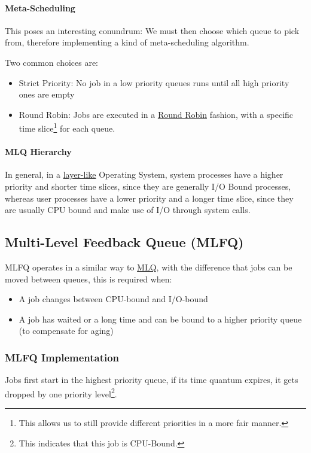 \documentclass[openright, twoside]{report}
\theoremstyle{definition}
\theoremstyle{example}
\begin{document}
	\paragraph{Meta-Scheduling} 
		This poses an interesting conundrum: We must then choose which queue to pick from,
		therefore implementing a kind of meta-scheduling algorithm.

		Two common choices are:
		\begin{itemize}
			\item Strict Priority: No job in a low priority queues runs until all high
			priority ones are empty
			\item Round Robin: Jobs are executed in a \hyperref[ssec:RR]{Round Robin} fashion,
			with a specific time slice\footnote{This allows us to still provide different
			priorities in a more fair manner.} for each queue.
		\end{itemize}

	\paragraph{MLQ Hierarchy}
	\label{par:MLQ_h}
		In general, in a \hyperref[par:OS_layer]{layer-like} Operating System,
		system processes have a higher priority and shorter time slices, since they are
		generally I/O Bound processes, whereas user processes have a lower priority and a 
		longer time slice, since they are usually CPU bound and make use of I/O through 
		system calls. 


	\subsection{Multi-Level Feedback Queue (MLFQ)}
	\label{ssec:MLFQ}
		MLFQ operates in a similar way to \hyperref[ssec:MLQ]{MLQ}, with the difference
		that jobs can be moved between queues, this is required when:
		\begin{itemize}
			\item A job changes between CPU-bound and I/O-bound
			\item A job has waited or a long time and can be bound to a higher priority
			queue (to compensate for aging)
		\end{itemize}

		\subsubsection{MLFQ Implementation}
		Jobs first start in the highest priority queue, if its time quantum expires,
		it gets dropped by one priority level\footnote{This indicates that this job
		is CPU-Bound.}.
\end{document}
